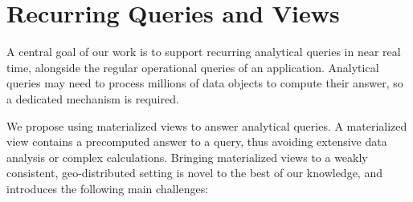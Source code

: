 \section{Recurring Queries and Views}
\label{sec:views_research_statement}

A central goal of our work is to support recurring analytical queries in near real time, alongside the regular operational queries of an application.
Analytical queries may need to process millions of data objects to compute their answer, so a dedicated mechanism is required.


We propose using materialized views to answer analytical queries.
A materialized view contains a precomputed answer to a query, thus avoiding extensive data analysis or complex calculations. 
Bringing materialized views to a weakly consistent, geo-distributed setting is novel to the best of our knowledge, and introduces the following main challenges:

